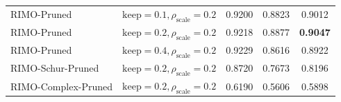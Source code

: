 \begin{table}[ht]
\begin{footnotesize}
\begin{sc}
{\begin{tabular}{llccc}
\midrule
RIMO-Pruned & $\text{keep} = 0.1, \rho_{\text{scale}} = 0.2$ & 0.9200 & 0.8823 & 0.9012 \\
RIMO-Pruned & $\text{keep} = 0.2, \rho_{\text{scale}} = 0.2$ & 0.9218 & 0.8877 & \textbf{0.9047} \\
RIMO-Pruned & $\text{keep} = 0.4, \rho_{\text{scale}} = 0.2$ & 0.9229 & 0.8616 & 0.8922 \\
RIMO-Schur-Pruned & $\text{keep} = 0.2, \rho_{\text{scale}} = 0.2$ & 0.8720 & 0.7673 & 0.8196 \\
RIMO-Complex-Pruned & $\text{keep} = 0.2, \rho_{\text{scale}} = 0.2$ & 0.6190 & 0.5606 & 0.5898 \\
\bottomrule
\end{tabular}%
}
\end{sc}
\end{footnotesize}
\vskip -0.15in
\end{table}


